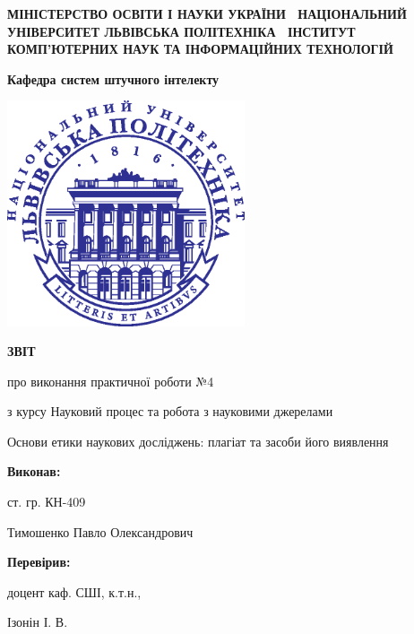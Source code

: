\documentclass[oneside,14pt,a4paper]{extreport}
\newcommand \labno    {4}
\newcommand \course   {Науковий процес та робота з науковими джерелами}
\newcommand \group    {409}
\newcommand \lecturer {Ізонін І. В.}
\newcommand \theme    {Основи етики наукових досліджень: плагіат та засоби його виявлення}
\begin{document}
\begin{titlepage}

\centering
 \textbf{
  МІНІСТЕРСТВО ОСВІТИ І НАУКИ УКРАЇНИ \
  НАЦІОНАЛЬНИЙ УНІВЕРСИТЕТ \flqq{}ЛЬВІВСЬКА ПОЛІТЕХНІКА\frqq{} \
  ІНСТИТУТ КОМП’ЮТЕРНИХ НАУК ТА ІНФОРМАЦІЙНИХ ТЕХНОЛОГІЙ
 }

\vspace{0.5cm}
 \textbf{
  Кафедра систем штучного інтелекту
}

\vspace*{\fill}

  {
    \centering
    \includegraphics[width=7cm]{imgs/logo.eps}
  }

\vspace{1cm}

  {\textbf{ЗВІТ} \par{}
  {про виконання практичної роботи №\labno}
   \par}
  {з курсу \flqq{}\course\frqq{} \par}

\vspace{1cm} \theme

\raggedleft\vfill

 {\textbf{Виконав:} \par}
 {ст. гр. КН-\group \par}
 {Тимошенко Павло Олександрович \par}


 {\textbf{Перевірив:} \par}
 {доцент каф. СШІ, к.т.н.,}
 {\lecturer \par}

\vspace{1cm}


\end{titlepage}
\end{document}
